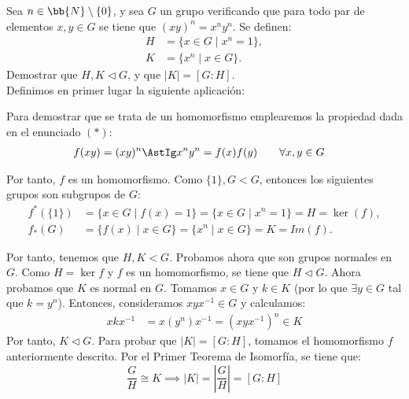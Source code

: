 \begin{ejercicio}
    Sea $n\in \bb{N}\setminus \{0\}$, y sea $G$ un grupo verificando que para todo par de elementos $x,y\in G$ se tiene que $(xy)^n=x^ny^n$. Se definen:
    \begin{align*}
        H &= \{x\in G\mid x^n=1\},\\
        K &= \{x^n\mid x\in G\}.
    \end{align*}
    Demostrar que $H,K\lhd G$, y que $|K|=[G:H]$.\\

    Definimos en primer lugar la siguiente aplicación:

    Para demostrar que se trata de un homomorfismo emplearemos la propiedad dada en el enunciado $(\ast)$:
    \begin{align*}
        f(xy) &= (xy)^n \AstIg x^ny^n = f(x)f(y)\qquad \forall x,y\in G
    \end{align*}

    Por tanto, $f$ es un homomorfismo. Como $\{1\},G<G$, entonces los siguientes grupos son subgrupos de $G$:
    \begin{align*}
        f^*(\{1\}) &= \{x\in G\mid f(x)=1\} = \{x\in G\mid x^n=1\} = H = \ker(f),\\
        f_*(G) &= \{f(x)\mid x\in G\} = \{x^n\mid x\in G\} = K = Im(f).
    \end{align*}

    Por tanto, tenemos que $H,K<G$. Probamos ahora que son grupos normales en $G$. Como $H=\ker f$ y $f$ es un homomorfismo, se tiene que $H\lhd G$. Ahora probamos que $K$ es normal en $G$. Tomamos $x\in G$ y $k\in K$ (por lo que $\exists y\in G$ tal que $k=y^n$). Entonces, consideramos $xyx^{-1}\in G$ y calculamos:
    \begin{align*}
        xkx^{-1} &= x(y^n)x^{-1} = (xyx^{-1})^n \in K
    \end{align*}
    Por tanto, $K\lhd G$. Para probar que $|K|=[G:H]$, tomamos el homomorfismo $f$ anteriormente descrito. Por el Primer Teorema de Isomorfía, se tiene que:
    \begin{equation*}
        \dfrac{G}{H}\cong K \implies |K| = \left|\dfrac{G}{H}\right| = [G:H]
    \end{equation*}
\end{ejercicio}


